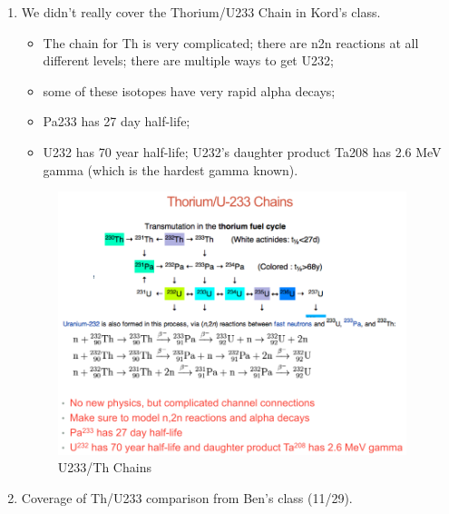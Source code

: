 \documentclass{school-22.211-notes}
\begin{document}
\clearpage
{}
\begin{enumerate}
 \item We didn't really cover the Thorium/U233 Chain in Kord's class. 
   \begin{itemize}
   \item The chain for Th is very complicated; there are n2n reactions at all different levels; there are multiple ways to get U232; 
   \item some of these isotopes have very rapid alpha decays; 
   \item Pa233 has 27 day half-life; 
   \item U232 has 70 year half-life; U232's daughter product Ta208 has 2.6 MeV gamma (which is the hardest gamma known). 
   \end{itemize}
   \begin{figure}[h]
     \centering
     \includegraphics[width=4in]{images/dfs/Th-U-chains.png}
     \caption{U233/Th Chains} 
   \end{figure}


\item Coverage of Th/U233 comparison from Ben's class (11/29). 


\end{enumerate}
\end{document}
